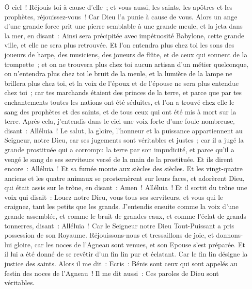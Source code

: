 \begin{multicols}{2}
Ô ciel~! Réjouis-toi à cause d'elle~; et vous aussi, les saints, les apôtres et les prophètes, réjouissez-vous~! Car Dieu l'a punie à cause de vous.
Alors un ange d'une grande force prit une pierre semblable à une grande meule, et la jeta dans la mer, en disant~: Ainsi sera précipitée avec impétuosité Babylone, cette grande ville, et elle ne sera plus retrouvée.
Et l'on entendra plus chez toi les sons des joueurs de harpe, des musiciens, des joueurs de flûte, et de ceux qui sonnent de la trompette~; et on ne trouvera plus chez toi aucun artisan d'un métier quelconque, on n'entendra plus chez toi le bruit de la meule,
et la lumière de la lampe ne brillera plus chez toi, et la voix de l'époux et de l'épouse ne sera plus entendue chez toi~; car tes marchands étaient des princes de la terre, et parce que par tes enchantements toutes les nations ont été séduites,
et l'on a trouvé chez elle le sang des prophètes et des saints, et de tous ceux qui ont été mis à mort sur la terre.
\VerseOne{}Après cela, j'entendis dans le ciel une voix forte d'une foule nombreuse, disant~: Alléluia~! Le salut, la gloire, l'honneur et la puissance appartiennent au Seigneur, notre Dieu,
car ses jugements sont véritables et justes~; car il a jugé la grande prostituée qui a corrompu la terre par son impudicité, et parce qu'il a vengé le sang de ses serviteurs versé de la main de la prostituée.
Et ils dirent encore~: Alléluia~! Et sa fumée monte aux siècles des siècles.
Et les vingt-quatre anciens et les quatre animaux se prosternèrent sur leurs faces, et adorèrent Dieu, qui était assis sur le trône, en disant~: Amen~! Alléluia~!
Et il sortit du trône une voix qui disait~: Louez notre Dieu, vous tous ses serviteurs, et vous qui le craignez, tant les petits que les grands.
J'entendis ensuite comme la voix d'une grande assemblée, et comme le bruit de grandes eaux, et comme l'éclat de grands tonnerres, disant~: Alléluia~! Car le Seigneur notre Dieu Tout-Puissant a pris possession de son Royaume.
Réjouissons-nous et tressaillons de joie, et donnons-lui gloire, car les noces de l'Agneau sont venues, et son Epouse s'est préparée.
Et il lui a été donné de se revêtir d'un fin lin pur et éclatant. Car le fin lin désigne la justice des saints.
Alors il me dit~: Ecris~: Bénis sont ceux qui sont appelés au festin des noces de l'Agneau~! Il me dit aussi~: Ces paroles de Dieu sont véritables.

\end{multicols}
